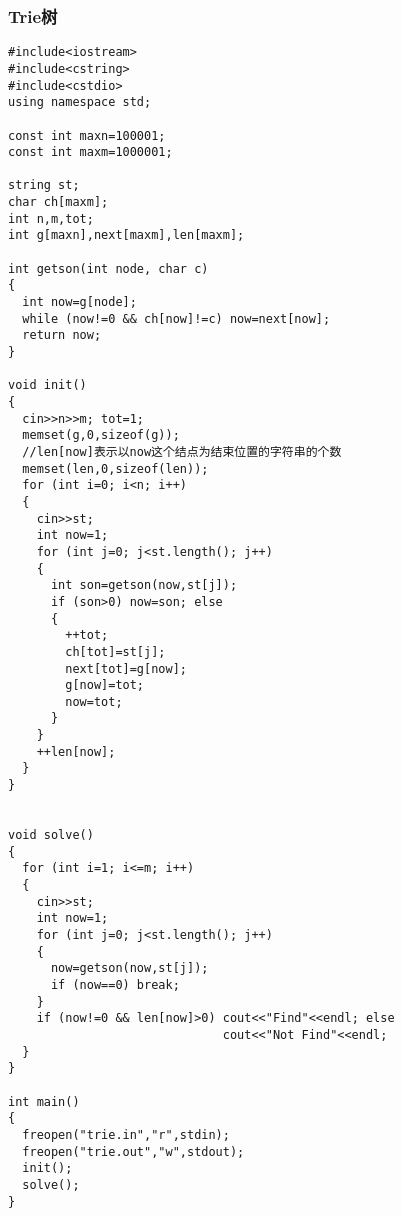 \subsubsection{Trie树}
\begin{verbatim}
#include<iostream>
#include<cstring>
#include<cstdio>
using namespace std;

const int maxn=100001;
const int maxm=1000001;

string st;
char ch[maxm];
int n,m,tot;
int g[maxn],next[maxm],len[maxm];

int getson(int node, char c)
{
  int now=g[node];
  while (now!=0 && ch[now]!=c) now=next[now];
  return now;
}

void init()
{
  cin>>n>>m; tot=1;
  memset(g,0,sizeof(g));
  //len[now]表示以now这个结点为结束位置的字符串的个数
  memset(len,0,sizeof(len));
  for (int i=0; i<n; i++)
  {
    cin>>st;
    int now=1;
    for (int j=0; j<st.length(); j++)
    {
      int son=getson(now,st[j]);
      if (son>0) now=son; else
      {
        ++tot;
        ch[tot]=st[j];
        next[tot]=g[now];
        g[now]=tot;
        now=tot;
      }
    }
    ++len[now];
  }
}


void solve()
{
  for (int i=1; i<=m; i++)
  {
    cin>>st;
    int now=1;
    for (int j=0; j<st.length(); j++)
    {
      now=getson(now,st[j]);
      if (now==0) break;
    }
    if (now!=0 && len[now]>0) cout<<"Find"<<endl; else
                              cout<<"Not Find"<<endl;
  }
}

int main()
{
  freopen("trie.in","r",stdin);
  freopen("trie.out","w",stdout);
  init();
  solve();
}
\end{verbatim}
